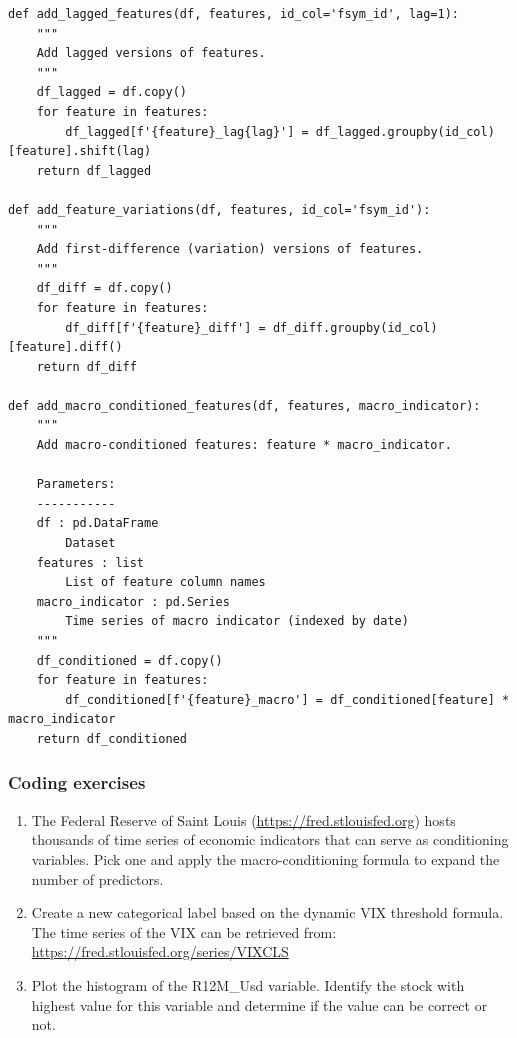 \begin{verbatim}
def add_lagged_features(df, features, id_col='fsym_id', lag=1):
    """
    Add lagged versions of features.
    """
    df_lagged = df.copy()
    for feature in features:
        df_lagged[f'{feature}_lag{lag}'] = df_lagged.groupby(id_col)[feature].shift(lag)
    return df_lagged

def add_feature_variations(df, features, id_col='fsym_id'):
    """
    Add first-difference (variation) versions of features.
    """
    df_diff = df.copy()
    for feature in features:
        df_diff[f'{feature}_diff'] = df_diff.groupby(id_col)[feature].diff()
    return df_diff

def add_macro_conditioned_features(df, features, macro_indicator):
    """
    Add macro-conditioned features: feature * macro_indicator.
    
    Parameters:
    -----------
    df : pd.DataFrame
        Dataset
    features : list
        List of feature column names
    macro_indicator : pd.Series
        Time series of macro indicator (indexed by date)
    """
    df_conditioned = df.copy()
    for feature in features:
        df_conditioned[f'{feature}_macro'] = df_conditioned[feature] * macro_indicator
    return df_conditioned
\end{verbatim}

\subsubsection{Coding exercises}

\begin{enumerate}
\item The Federal Reserve of Saint Louis (\href{https://fred.stlouisfed.org}{https://fred.stlouisfed.org}) hosts thousands of time series of economic indicators that can serve as conditioning variables. Pick one and apply the macro-conditioning formula to expand the number of predictors.
\item Create a new categorical label based on the dynamic VIX threshold formula. The time series of the VIX can be retrieved from: \href{https://fred.stlouisfed.org/series/VIXCLS}{https://fred.stlouisfed.org/series/VIXCLS}
\item Plot the histogram of the R12M\_Usd variable. Identify the stock with highest value for this variable and determine if the value can be correct or not.
\end{enumerate}
